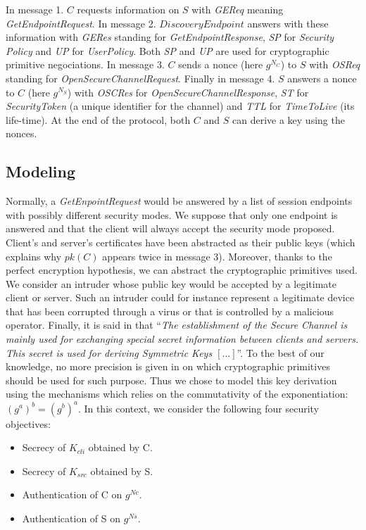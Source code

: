 In message 1. $C$ requests information on $S$ with {\em GEReq} meaning
{\em GetEndpointRequest}.
In message 2. $DiscoveryEndpoint$ answers with these information with
{\em GERes} standing for {\em GetEndpointResponse}, {\em SP} for
{\em Security Policy} and {\em UP} for {\em UserPolicy}.
Both {\em SP} and {\em UP} are used for cryptographic primitive negociations.
In message 3. $C$ sends a nonce (here $g^{N_{C}}$) to $S$ with {\em OSReq}
standing for {\em OpenSecureChannelRequest}.
Finally in message 4. $S$ answers a nonce to $C$ (here $g^{N_{S}}$) with
{\em OSCRes} for {\em OpenSecureChannelResponse}, {\em ST} for
{\em SecurityToken} (a unique identifier for the channel) and {\em TTL} for
{\em TimeToLive} (its life-time).
At the end of the protocol, both $C$ and $S$ can derive a key using the nonces.

\subsection{Modeling}

Normally, a {\em GetEnpointRequest} would be answered by a list of
session endpoints with possibly different security modes. We suppose
that only one endpoint is answered and that the client will always
accept the security mode proposed.
Client's and server's certificates have been abstracted as their public
keys (which explains why $pk(C)$ appears twice in message 3).
Moreover, thanks to the perfect
encryption hypothesis, we can abstract the cryptographic primitives
used.  We consider an intruder whose public key would be accepted by a
legitimate client or server.  Such an intruder could for instance
represent a legitimate device that has been corrupted through a virus
or that is controlled by a malicious operator.  Finally, it is said in
\cite{MLD09} that ``\emph{The establishment of the Secure Channel is
  mainly used for exchanging special secret information between
  clients and servers. This secret is used for deriving Symmetric Keys
  $[...]$}''.  To the best of our knowledge, no more precision is
given in \cite{MLD09,opcua_part2,opcua_part4,opcua_part6} on which
cryptographic primitives should be used for such purpose.  Thus we
chose to model this key derivation using the \DiH mechanisms which
relies on the commutativity of the exponentiation: $(g^a)^b =
(g^b)^a$.  In this context, we consider the following four security
objectives:
\vspace{-.5em}
\begin{itemize}
    \item\label{item:sc_sec_cli} Secrecy of $K_{cli}$ obtained by C.
    \item\label{item:sc_sec_srv} Secrecy of $K_{src}$ obtained by S.
    \item\label{item:sc_auth_cli} Authentication of C on $g^{Nc}$.
    \item\label{item:sc_auth_srv} Authentication of S on $g^{Ns}$.
\end{itemize}

